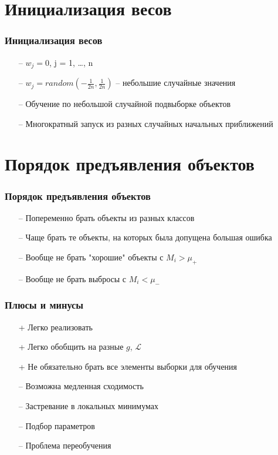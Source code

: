 \documentclass[10pt]{beamer}
\begin{document}
\section{Инициализация весов}

\begin{frame}\frametitle{Инициализация весов}
	\begin{itemize}
		\item[--] $w_j = 0$, j = 1, \dots, n
		\item[--] $w_j = random(-\frac{1}{2n}, \frac{1}{2n})$ -- небольшие случайные значения
		\item[--] Обучение по небольшой случайной подвыборке объектов
		\item[--] Многократный запуск из разных случайных начальных приближений
	\end{itemize}
\end{frame}

\section{Порядок предъявления объектов}

\begin{frame}\frametitle{Порядок предъявления объектов}
	\begin{itemize}
		\item[--] Попеременно брать объекты из разных классов
		\item[--] Чаще брать те объекты, на которых была допущена большая ошибка
		\item[--] Вообще не брать "хорошие" объекты с $M_i > \mu_+$
		\item[--] Вообще не брать выбросы с $M_i < \mu_-$
	\end{itemize}
\end{frame}

\begin{frame}\frametitle{Плюсы и минусы}
	\begin{itemize} [<+->]
	\item[+] Легко реализовать
	\item[+] Легко обобщить на разные $g$, $\mathcal{L}$
	\item[+] Не обязательно брать все элементы выборки для обучения
	\bigbreak
	\item[--] Возможна медленная сходимость
	\item[--] Застревание в локальных минимумах
	\item[--] Подбор параметров
	\item[--] Проблема переобучения
	\end{itemize}
\end{frame}
\end{document}
